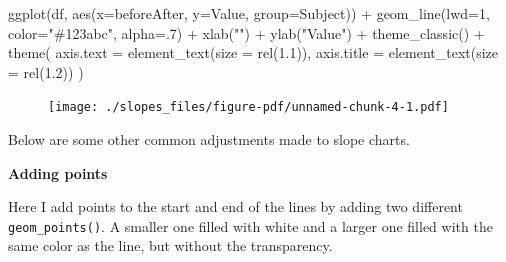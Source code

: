 \documentclass[
  letterpaper,
  DIV=11,
  numbers=noendperiod]{scrreprt}
\newenvironment{Shaded}{\begin{snugshade}}{\end{snugshade}}
\newcommand{\AttributeTok}[1]{\textcolor[rgb]{0.40,0.45,0.13}{#1}}
\newcommand{\DecValTok}[1]{\textcolor[rgb]{0.68,0.00,0.00}{#1}}
\newcommand{\FloatTok}[1]{\textcolor[rgb]{0.68,0.00,0.00}{#1}}
\newcommand{\FunctionTok}[1]{\textcolor[rgb]{0.28,0.35,0.67}{#1}}
\newcommand{\NormalTok}[1]{\textcolor[rgb]{0.00,0.23,0.31}{#1}}
\newcommand{\SpecialCharTok}[1]{\textcolor[rgb]{0.37,0.37,0.37}{#1}}
\newcommand{\StringTok}[1]{\textcolor[rgb]{0.13,0.47,0.30}{#1}}
\begin{document}
\begin{Shaded}
\begin{Highlighting}[]
\FunctionTok{ggplot}\NormalTok{(df, }\FunctionTok{aes}\NormalTok{(}\AttributeTok{x=}\NormalTok{beforeAfter, }\AttributeTok{y=}\NormalTok{Value, }\AttributeTok{group=}\NormalTok{Subject)) }\SpecialCharTok{+}
  \FunctionTok{geom\_line}\NormalTok{(}\AttributeTok{lwd=}\DecValTok{1}\NormalTok{, }\AttributeTok{color=}\StringTok{"\#123abc"}\NormalTok{, }\AttributeTok{alpha=}\NormalTok{.}\DecValTok{7}\NormalTok{) }\SpecialCharTok{+}
  \FunctionTok{xlab}\NormalTok{(}\StringTok{""}\NormalTok{) }\SpecialCharTok{+}
  \FunctionTok{ylab}\NormalTok{(}\StringTok{"Value"}\NormalTok{) }\SpecialCharTok{+}
  \FunctionTok{theme\_classic}\NormalTok{() }\SpecialCharTok{+}
  \FunctionTok{theme}\NormalTok{(}
    \AttributeTok{axis.text =} \FunctionTok{element\_text}\NormalTok{(}\AttributeTok{size =} \FunctionTok{rel}\NormalTok{(}\FloatTok{1.1}\NormalTok{)),}
    \AttributeTok{axis.title =} \FunctionTok{element\_text}\NormalTok{(}\AttributeTok{size =} \FunctionTok{rel}\NormalTok{(}\FloatTok{1.2}\NormalTok{))}
\NormalTok{  ) }
\end{Highlighting}
\end{Shaded}

\begin{figure}[H]

{\centering \texttt{[image: ./slopes\_files/figure-pdf/unnamed-chunk-4-1.pdf]}

}

\end{figure}

Below are some other common adjustments made to slope charts.

\textbf{Adding points}

Here I add points to the start and end of the lines by adding two
different \texttt{geom\_points()}. A smaller one filled with white and a
larger one filled with the same color as the line, but without the
transparency.
\end{document}
